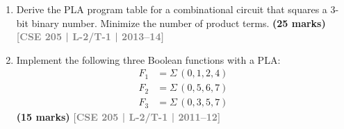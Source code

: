 \documentclass[12pt]{article}
\newcommand{\yr}[1]{\hfill\textcolor{gray}{\small\textbf{[#1]}}}
\newcommand{\mk}[1]{\textcolor{orange!70!black}{\small\textbf{(#1 marks)}}}
\begin{document}
\begin{enumerate}
\item Derive the PLA program table for a combinational circuit that squares a 3-bit binary number. Minimize the number of product terms.
\mk{25} \yr{CSE 205 | L-2/T-1 | 2013--14}

\item Implement the following three Boolean functions with a PLA:
\begin{align*}
  F_1 &= \Sigma\,(0,1,2,4) \\
  F_2 &= \Sigma\,(0,5,6,7) \\
  F_3 &= \Sigma\,(0,3,5,7)
\end{align*}
\mk{15} \yr{CSE 205 | L-2/T-1 | 2011--12}

\end{enumerate}
\end{document}

